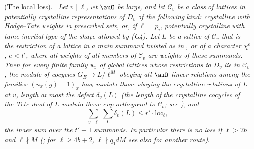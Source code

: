 \documentclass[10pt]{amsart}
\theoremstyle{definition}
\theoremstyle{remark}
\providecommand{\pgG}{G_E}
\providecommand{\pgloc}{\mathrm{loc}}
\newenvironment{quotedthm}[2]{\par\medskip\noindent\begingroup
  \textbf{#1}#2.\ \itshape\ignorespaces}{\endgroup\par\medskip}
\begin{document}
\begin{quotedthm}{\cite[Proposition~2.28]{P55}}{ (The local loss)}
Let $v\mid\ell$, let $\auO$ be large, and let $\mathcal C_v$ be a class of lattices in potentially
crystalline representations of $D_v$ of the following kind: crystalline with Hodge--Tate weights in
prescribed sets, or, if $\ell=p_i$, potentially crystalline with tame inertial type of the shape
allowed by (G4). Let $L$ be a lattice of $\mathcal C_v$ that is the restriction of a lattice in a
main summand twisted as in {\cite[Theorem~2.10]{P55}}, or of a character $\chi^e$, $e<t'$, where all
weights of all members of $\mathcal C_v$ are weights of these summands. Then for every finite family $u_x$ of global lattices whose restrictions to $D_v$ lie in $\mathcal C_v$, the module of cocycles $\pgG\to L/\ell^M$ obeying all $\auO$-linear relations among the families $(u_x(g)-1)_x$ has, modulo those obeying the crystalline relations of $L$ at $v$, length at most the \emph{defect} $\delta_v(L)$ (the length of the crystalline cocycles of the Tate dual of $L$ modulo those cup-orthogonal to $\mathcal C_v$; see {\cite[Proposition~4.5]{P55}}),
and
\[
\sum_{v\mid\ell}\ \sum_{L}\delta_v(L)\le r'\cdot\pgloc_\ell ,
\]
the inner sum over the $t'+1$ summands. In particular there is no loss if $\ell>2b$ and $\ell\nmid M$ ({\cite[Theorem~5.8(d)]{P55}}; for $\ell\ge4b+2$, $\ell\nmid q_1dM$ see also {\cite[Remark~5.7]{P55}} for another route).
\end{quotedthm}
\end{document}
